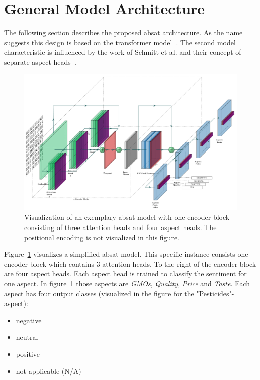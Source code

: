 \section{General Model Architecture}

The following section describes the proposed \acrfull{absat} architecture. As the name suggests this design is based on the transformer model~\cite{Vaswani2017}. The second model characteristic is influenced by the work of Schmitt et al. and their concept of separate aspect heads~\cite{Schmitt2018}.
\bigskip

\begin{figure}[htp]
	\centering
	\includegraphics[width=\textwidth]{figures/04_method/04_t-absa}
	\caption{Visualization of an exemplary \acrfull{absat} model with one encoder block consisting of three attention heads and four aspect heads. The positional encoding is not visualized in this figure.}
	\label{fig:04_t-absa}
\end{figure}

Figure~\ref{fig:04_t-absa} visualizes a simplified \gls{absat} model. This specific instance consists one encoder block which contains 3 attention heads. To the right of the encoder block are four aspect heads. Each aspect head is trained to classify the sentiment for one aspect. In figure~\ref{fig:04_t-absa} those aspects are \textit{GMOs}, \textit{Quality}, \textit{Price} and \textit{Taste}. Each aspect has four output classes {(visualized in the figure for the "Pesticides"-aspect)}:

\begin{itemize}
	\item negative
	\item neutral
	\item positive
	\item not applicable {(N/A)}
\end{itemize}

